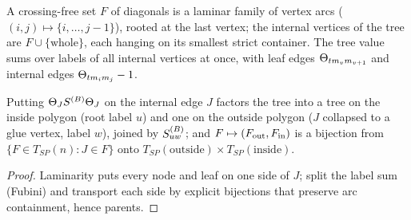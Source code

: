 \begin{definition}\label{def:tree-general}
  \leanok
  A crossing-free set $F$ of diagonals is a laminar family of vertex arcs ($(i,j)\mapsto
  \{i,\dots,j-1\}$), rooted at the last vertex; the internal vertices of the tree are
  $F\cup\{\text{whole}\}$, each hanging on its smallest strict container.  The tree value sums
  over labels of all internal vertices at once, with leaf edges $\Theta_{tm_vm_{v+1}}$ and
  internal edges $\Theta_{tm_im_j}-1$.
\end{definition}

\begin{lemma}\label{lem:tree-cut}
  \leanok
  Putting $\Theta_JS^{(B)}\Theta_J$ on the internal edge $J$ factors the tree into a tree on the inside
  polygon (root label $u$) and one on the outside polygon ($J$ collapsed to a glue vertex,
  label $w$), joined by $S^{(B)}_{uw}$; and $F\mapsto(F_{\rm out},F_{\rm in})$ is a bijection from
  $\{F\in T_{SP}(n):J\in F\}$ onto $T_{SP}(\text{outside})\times T_{SP}(\text{inside})$.
\end{lemma}
\begin{proof}\leanok{}
  Laminarity puts every node and leaf on one side of $J$; split the label sum (Fubini) and
  transport each side by explicit bijections that preserve arc containment, hence parents.
\end{proof}


